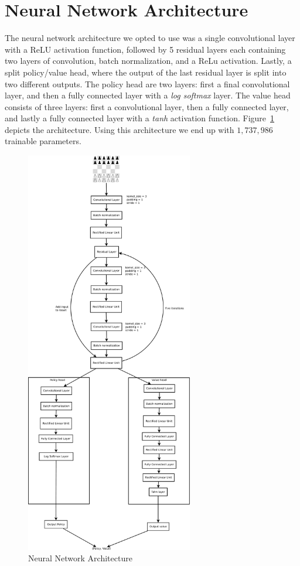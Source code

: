\section{Neural Network Architecture}

The neural network architecture we opted to use was a single convolutional layer with a ReLU\cite{hinton:relu} activation function, followed by 5 residual layers each containing two layers of convolution, batch normalization, and a ReLu activation. Lastly, a split policy/value head, where the output of the last residual layer is split into two different outputs. The policy head are two layers: first a final convolutional layer, and then a fully connected layer with a \textit{log softmax} layer. The value head consists of three layers: first a convolutional layer, then a fully connected layer, and lastly a fully connected layer with a \textit{tanh} activation function. Figure~\ref{fig:nnarch} depicts the architecture. Using this architecture we end up with $1{,}737{,}986$ trainable parameters.

\begin{figure}[]
    \centering

    \includegraphics[width=0.65\textwidth]{graphics/test}

    \caption{Neural Network Architecture}
    \label{fig:nnarch}
\end{figure}

